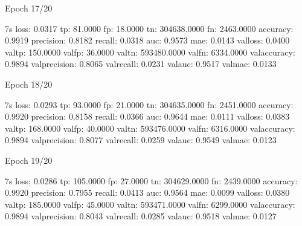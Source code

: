 \documentclass[letterpaper,10pt,english]{sphinxmanual}
\begin{document}
\begin{sphinxVerbatim}[commandchars=\\\{\}]
Epoch 17/20
\end{sphinxVerbatim}

\begin{sphinxVerbatim}[commandchars=\\\{\}]
 \PYGZhy{} 7s \PYGZhy{} loss: 0.0317 \PYGZhy{} tp: 81.0000 \PYGZhy{} fp: 18.0000 \PYGZhy{} tn: 304638.0000 \PYGZhy{} fn: 2463.0000 \PYGZhy{} accuracy: 0.9919 \PYGZhy{} precision: 0.8182 \PYGZhy{} recall: 0.0318 \PYGZhy{} auc: 0.9573 \PYGZhy{} mae: 0.0143 \PYGZhy{} val\PYGZus{}loss: 0.0400 \PYGZhy{} val\PYGZus{}tp: 150.0000 \PYGZhy{} val\PYGZus{}fp: 36.0000 \PYGZhy{} val\PYGZus{}tn: 593480.0000 \PYGZhy{} val\PYGZus{}fn: 6334.0000 \PYGZhy{} val\PYGZus{}accuracy: 0.9894 \PYGZhy{} val\PYGZus{}precision: 0.8065 \PYGZhy{} val\PYGZus{}recall: 0.0231 \PYGZhy{} val\PYGZus{}auc: 0.9517 \PYGZhy{} val\PYGZus{}mae: 0.0133
\end{sphinxVerbatim}

\begin{sphinxVerbatim}[commandchars=\\\{\}]
Epoch 18/20
\end{sphinxVerbatim}

\begin{sphinxVerbatim}[commandchars=\\\{\}]
 \PYGZhy{} 7s \PYGZhy{} loss: 0.0293 \PYGZhy{} tp: 93.0000 \PYGZhy{} fp: 21.0000 \PYGZhy{} tn: 304635.0000 \PYGZhy{} fn: 2451.0000 \PYGZhy{} accuracy: 0.9920 \PYGZhy{} precision: 0.8158 \PYGZhy{} recall: 0.0366 \PYGZhy{} auc: 0.9644 \PYGZhy{} mae: 0.0111 \PYGZhy{} val\PYGZus{}loss: 0.0383 \PYGZhy{} val\PYGZus{}tp: 168.0000 \PYGZhy{} val\PYGZus{}fp: 40.0000 \PYGZhy{} val\PYGZus{}tn: 593476.0000 \PYGZhy{} val\PYGZus{}fn: 6316.0000 \PYGZhy{} val\PYGZus{}accuracy: 0.9894 \PYGZhy{} val\PYGZus{}precision: 0.8077 \PYGZhy{} val\PYGZus{}recall: 0.0259 \PYGZhy{} val\PYGZus{}auc: 0.9549 \PYGZhy{} val\PYGZus{}mae: 0.0123
\end{sphinxVerbatim}

\begin{sphinxVerbatim}[commandchars=\\\{\}]
Epoch 19/20
\end{sphinxVerbatim}

\begin{sphinxVerbatim}[commandchars=\\\{\}]
 \PYGZhy{} 7s \PYGZhy{} loss: 0.0286 \PYGZhy{} tp: 105.0000 \PYGZhy{} fp: 27.0000 \PYGZhy{} tn: 304629.0000 \PYGZhy{} fn: 2439.0000 \PYGZhy{} accuracy: 0.9920 \PYGZhy{} precision: 0.7955 \PYGZhy{} recall: 0.0413 \PYGZhy{} auc: 0.9564 \PYGZhy{} mae: 0.0099 \PYGZhy{} val\PYGZus{}loss: 0.0380 \PYGZhy{} val\PYGZus{}tp: 185.0000 \PYGZhy{} val\PYGZus{}fp: 45.0000 \PYGZhy{} val\PYGZus{}tn: 593471.0000 \PYGZhy{} val\PYGZus{}fn: 6299.0000 \PYGZhy{} val\PYGZus{}accuracy: 0.9894 \PYGZhy{} val\PYGZus{}precision: 0.8043 \PYGZhy{} val\PYGZus{}recall: 0.0285 \PYGZhy{} val\PYGZus{}auc: 0.9518 \PYGZhy{} val\PYGZus{}mae: 0.0127
\end{sphinxVerbatim}
\end{document}
